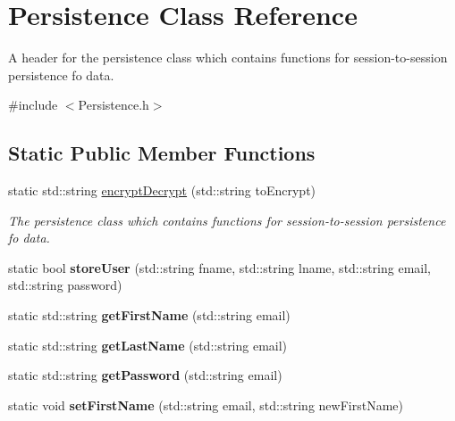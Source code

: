 \hypertarget{class_persistence}{}\section{Persistence Class Reference}
\label{class_persistence}


A header for the persistence class which contains functions for session-\/to-\/session persistence fo data.  




{\ttfamily \#include $<$Persistence.\+h$>$}

\subsection*{Static Public Member Functions}
\begin{DoxyCompactItemize}
\item 
static std\+::string \hyperlink{class_persistence_a38f1125e76c047670ad2387e1ac8dcd8}{encrypt\+Decrypt} (std\+::string to\+Encrypt)
\begin{DoxyCompactList}\small\item\em The persistence class which contains functions for session-\/to-\/session persistence fo data. \end{DoxyCompactList}\item 
\mbox{\label{class_persistence_a3da2a0f3eafae169d9f59f3b5343b9fa}} 
static bool {\bfseries store\+User} (std\+::string fname, std\+::string lname, std\+::string email, std\+::string password)
\item 
\mbox{\label{class_persistence_aeb6a5d5bfff4f24267003ee362fef7f5}} 
static std\+::string {\bfseries get\+First\+Name} (std\+::string email)
\item 
\mbox{\label{class_persistence_a37273f97d212d8c53fc99b0434810ae7}} 
static std\+::string {\bfseries get\+Last\+Name} (std\+::string email)
\item 
\mbox{\label{class_persistence_a5ecffbf68906e06c497cafc758f80364}} 
static std\+::string {\bfseries get\+Password} (std\+::string email)
\item 
\mbox{\label{class_persistence_afe33a1d14f14aabea3db95ea81e1c711}} 
static void {\bfseries set\+First\+Name} (std\+::string email, std\+::string new\+First\+Name)

\end{DoxyCompactItemize}
